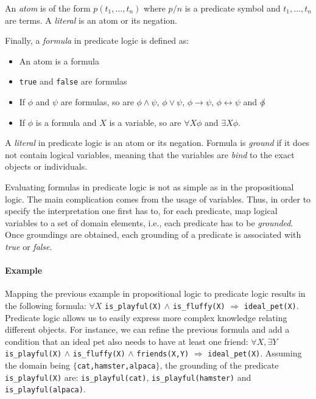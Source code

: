 An \textit{atom} is of the form $p(t_1,...,t_n)$ where $p/n$ is a predicate symbol and $t_1,...,t_n$ are terms.
A \textit{literal} is an atom or its negation.


Finally, a \textit{formula} in predicate logic is defined as:
\begin{itemize}
	\item An atom is a formula
	\item \texttt{true} and \texttt{false} are formulas
	\item If $\phi$ and $\psi$ are formulas, so are $\phi \wedge \psi$, $\phi \vee \psi$, $\phi \rightarrow \psi$, $\phi \leftrightarrow \psi$ and $\not \phi$
	\item If $\phi$ is a formula and $X$ is a variable, so are $\forall X \phi$ and $\exists X \phi$.
\end{itemize}


A \textit{literal} in predicate logic is an atom or its negation.
Formula is \textit{ground} if it does not contain logical variables, meaning that the variables are \textit{bind} to the exact objects or individuals.


 
 
 


Evaluating formulas in predicate logic is not as simple as in the propositional logic.
The main complication comes from the usage of variables.
Thus, in order to specify the interpretation one first has to, for each predicate,  map logical variables to a set of domain elements, i.e., each predicate has to be \textit{grounded}.
Once groundings are obtained, each grounding of a predicate is associated with \textit{true} or \textit{false}.



\paragraph{Example} Mapping the previous example in propositional logic to predicate logic results in the following formula: $\forall X$ \texttt{is\_playful(X)} $\wedge$ \texttt{is\_fluffy(X)} $\Rightarrow$ \texttt{ideal\_pet(X)}.
 Predicate logic allows us to easily express more complex knowledge relating different objects.
 For instance, we can refine the previous formula and add a condition that an ideal pet also needs to have at least one friend: $\forall X, \exists Y$ \texttt{is\_playful(X)} $\wedge$ \texttt{is\_fluffy(X)} $\wedge$ \texttt{friends(X,Y)} $\Rightarrow$ \texttt{ideal\_pet(X)}.
 Assuming the domain being $\{$\texttt{cat,hamster,alpaca}$\}$, the grounding of the predicate \texttt{is\_playful(X)} are: \texttt{is\_playful(cat)}, \texttt{is\_playful(hamster)} and \texttt{is\_playful(alpaca)}.
 
